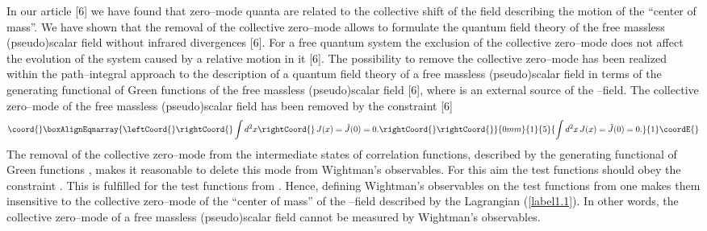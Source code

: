\documentclass[a4paper,12pt] {article}
\begin{document}
In our article [6] we have found that zero--mode quanta are related to
the collective shift of the field \coordHE{} describing the motion
of the ``center of mass''. We have shown that the removal of the
collective zero--mode allows to formulate the quantum field theory of
the free massless (pseudo)scalar field without infrared divergences
[6]. For a free quantum system the exclusion of the collective
zero--mode does not affect the evolution of the system caused by a
relative motion in it [6]. The possibility to remove the collective
zero--mode has been realized within the path--integral approach to the
description of a quantum field theory of a free massless
(pseudo)scalar field \coordHE{} in terms of the generating
functional of Green functions \coordHE{} of the free massless
(pseudo)scalar field \coordHE{} [6], where \coordHE{} is an external
source of the \myHighlight{$\vartheta$}\coordHE{}--field. The collective zero--mode of the
free massless (pseudo)scalar field has been removed by the constraint
[6]
%
\begin{eqnarray}\coord{}\boxAlignEqnarray{\leftCoord{}\rightCoord{}\label{label1.14}
\int d^2x\rightCoord{}\,J(x) = \tilde{J}(0) = 0. \rightCoord{}
\rightCoord{}}{0mm}{1}{5}{\int d^2x\,J(x) = \tilde{J}(0) = 0. 
}{1}\coordE{}\end{eqnarray}
%
The removal of the collective zero--mode from the intermediate states
of correlation functions, described by the generating functional of
Green functions \coordHE{}, makes it reasonable to delete this mode from
Wightman's observables. For this aim the test functions should obey
the constraint \coordHE{}. This is fulfilled for the test
functions \coordHE{} from \coordHE{}. Hence, defining
Wightman's observables on the test functions from \coordHE{} one makes them insensitive to the collective
zero--mode of the ``center of mass'' of the \myHighlight{$\vartheta$}\coordHE{}--field
described by the Lagrangian (\ref{label1.1}). In other words, the
collective zero--mode of a free massless (pseudo)scalar field cannot
be measured by Wightman's observables.
\end{document}
